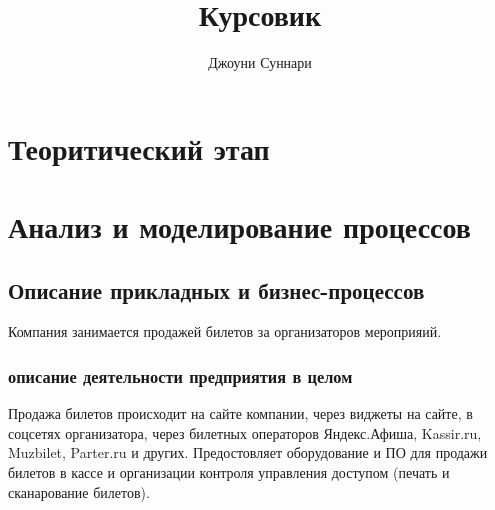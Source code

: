 \documentclass{article}
\author{Джоуни Суннари}
\title{Курсовик}
\begin{document}
\maketitle
\pagebreak
\tableofcontents
\pagebreak

\section{Теоритический этап}

\pagebreak

\section{Анализ и моделирование процессов}


\subsection{Описание прикладных и бизнес-процессов}

Компания занимается продажей билетов за организаторов мероприяий.


\subsubsection{описание деятельности предприятия в целом}
Продажа билетов происходит на сайте компании, через виджеты на сайте, в соцсетях организатора,
через билетных операторов Яндекс.Афиша, Kassir.ru, Muzbilet, Parter.ru и других.
Предостовляет оборудование и ПО для продажи билетов в кассе
и организации контроля управления доступом (печать и сканарование билетов).
\end{document}
